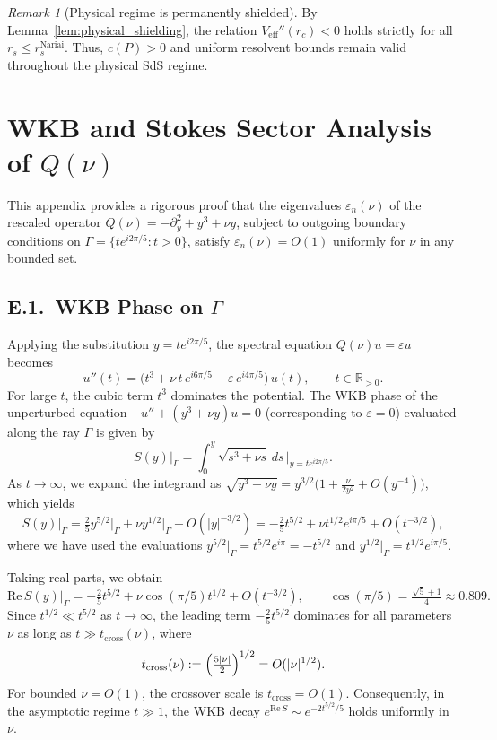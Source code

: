 \documentclass[12pt,a4paper]{amsart}
\theoremstyle{remark}
\newtheorem{remark}[theorem]{Remark}
\begin{document}
\begin{remark}[Physical regime is permanently shielded]
By Lemma~\ref{lem:physical_shielding}, the relation $V_{\mathrm{eff}}''(r_c) < 0$
holds strictly for all $r_s \leq r_s^{\mathrm{Nariai}}$. Thus, $c(P) > 0$
and uniform resolvent bounds remain valid throughout the physical SdS regime.
\end{remark}

\section{WKB and Stokes Sector Analysis of $Q(\nu)$}
\label{app:Qnu}

This appendix provides a rigorous proof that the eigenvalues $\varepsilon_n(\nu)$
of the rescaled operator $Q(\nu) = -\partial_y^2 + y^3 + \nu y$, subject to
outgoing boundary conditions on $\Gamma = \{te^{i2\pi/5} : t > 0\}$, satisfy
$\varepsilon_n(\nu) = O(1)$ uniformly for $\nu$ in any bounded set.

\subsection*{E.1.~WKB Phase on $\Gamma$}

Applying the substitution $y = te^{i2\pi/5}$, the spectral equation
$Q(\nu)u = \varepsilon u$ becomes
\begin{equation}\label{eq:Qnu_transformed}
  u''(t) = \bigl(t^3 + \nu\, t\, e^{i6\pi/5} - \varepsilon\, e^{i4\pi/5}\bigr)\,u(t),
  \qquad t \in \mathbb{R}_{>0}.
\end{equation}
For large $t$, the cubic term $t^3$ dominates the potential. The WKB phase of the
unperturbed equation $-u'' + (y^3 + \nu y)u = 0$ (corresponding to $\varepsilon = 0$)
evaluated along the ray $\Gamma$ is given by
\[
  S(y)\big|_\Gamma
  = \int_0^y \sqrt{s^3 + \nu s}\,ds\,\bigg|_{y = te^{i2\pi/5}}.
\]
As $t \to \infty$, we expand the integrand as
$\sqrt{y^3 + \nu y} = y^{3/2}\bigl(1 + \frac{\nu}{2y^2} + O(y^{-4})\bigr)$, which yields
\[
  S(y)\big|_\Gamma
  = \tfrac{2}{5}y^{5/2}\big|_\Gamma + \nu y^{1/2}\big|_\Gamma + O(|y|^{-3/2})
  = -\tfrac{2}{5}t^{5/2} + \nu t^{1/2} e^{i\pi/5} + O(t^{-3/2}),
\]
where we have used the evaluations $y^{5/2}\big|_\Gamma = t^{5/2}e^{i\pi} = -t^{5/2}$
and $y^{1/2}\big|_\Gamma = t^{1/2}e^{i\pi/5}$.

Taking real parts, we obtain
\begin{equation}\label{eq:ReS}
  \mathrm{Re}\,S(y)\big|_\Gamma
  = -\tfrac{2}{5}t^{5/2} + \nu\cos(\pi/5) t^{1/2} + O(t^{-3/2}),
  \qquad \cos(\pi/5) = \tfrac{\sqrt{5}+1}{4} \approx 0.809.
\end{equation}
Since $t^{1/2} \ll t^{5/2}$ as $t\to\infty$, the leading term $-\frac{2}{5}t^{5/2}$
dominates for all parameters $\nu$ as long as $t \gg t_{\mathrm{cross}}(\nu)$, where
\[
  t_{\mathrm{cross}}(\nu) := \Bigl(\tfrac{5|\nu|}{2}\Bigr)^{1/2} = O(|\nu|^{1/2}).
\]
For bounded $\nu = O(1)$, the crossover scale is $t_{\mathrm{cross}} = O(1)$. Consequently,
in the asymptotic regime $t \gg 1$, the WKB decay $e^{\mathrm{Re}\,S} \sim e^{-2t^{5/2}/5}$
holds uniformly in $\nu$.
\end{document}
